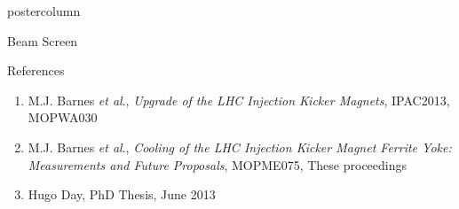 \documentclass[final,hyperref={pdfpagelabels=false}]{beamer}
\begin{document}
\begin{frame}
\begin{columns}
\begin{column}{.49\textwidth}
\begin{beamercolorbox}[center,wd=\textwidth]{postercolumn}
\begin{minipage}[T]{.95\textwidth}
{\begin{block}{Beam Screen}
	\end{block}

            \vfill

\vfill
\begin{block}{References}
\begin{enumerate}
\item{\small{M.J. Barnes \emph{et al}., \emph{Upgrade of the LHC Injection Kicker Magnets}, IPAC2013, MOPWA030}}
\item{\small{M.J. Barnes \emph{et al}., \emph{Cooling of the LHC Injection Kicker Magnet Ferrite Yoke: Measurements and Future Proposals}, MOPME075, These proceedings}}
\item{\small{Hugo Day, PhD Thesis, June 2013}}
\end{enumerate}
\end{block}
         \vfill
          }
        \end{minipage}
      \end{beamercolorbox}
    \end{column}


\end{columns}
\end{frame}
\end{document}
